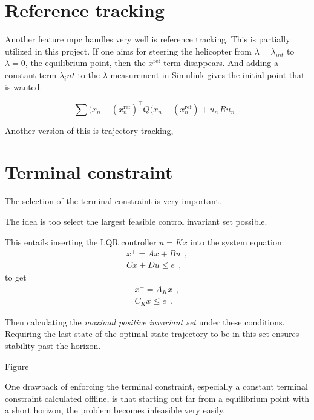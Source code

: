 \section{Reference tracking}

Another feature \acrshort{mpc} handles very well is reference tracking.
This is partially utilized in this project. If one aims for steering the helicopter from $\lambda = \lambda_{int}$ to $\lambda = 0$, the equilibrium point, then the $x^{\text{ref}}$ term disappears. And adding a constant term $\lambda_int$ to the $\lambda$ measurement in Simulink gives  the initial point that is wanted. 


\begin{equation}
    \sum (x_n - (x^{\text{ref}}_n)^\top Q (x_n - (x^{\text{ref}}_n) + u_n^\top R u_n \: \: .
\end{equation}

Another version of this is trajectory tracking, 

\section{Terminal constraint}\label{sec:terminal_constraint}

The selection of the terminal constraint is very important.

The idea is too select the largest feasible control invariant set possible.

This entails inserting the LQR controller $u = Kx$ into the system equation
\begin{equation}
    \begin{split}
        x^+ = A x + B u \: \: , \\
        C x + D u \leq e \: \: ,
    \end{split}
\end{equation}
to get
\begin{equation}
    \begin{split}
        x^+ = A_K x \: \: , \\
        C_K x \leq e \: \: .
    \end{split}        
\end{equation}

Then calculating the \textit{maximal positive invariant set} under these conditions. Requiring the last state of the optimal state trajectory to be in this set ensures stability past the horizon. 

Figure


One drawback of enforcing the terminal constraint, especially a constant terminal constraint calculated offline, is that starting out far from a equilibrium point with a short horizon, the problem becomes infeasible very easily. 

